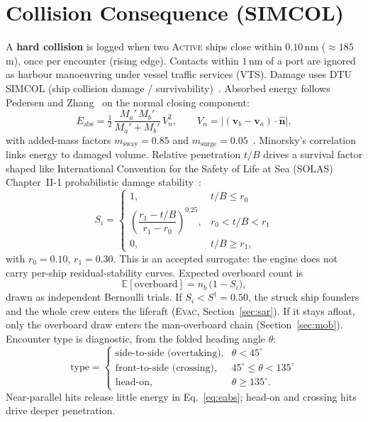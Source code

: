 \documentclass[cameraready]{Interspeech}
\begin{document}
\section{Collision Consequence (SIMCOL)}
\label{sec:consequence}

A \textbf{hard collision} is logged when two \textsc{Active} ships close within $0.10$\,nm (${\approx}185$\,m), once per encounter (rising edge). Contacts within $1$\,nm of a port are ignored as harbour manoeuvring under vessel traffic services (VTS). Damage uses DTU SIMCOL (ship collision damage / survivability)~\cite{lutzen2001}. Absorbed energy follows Pedersen and Zhang~\cite{pedersenzhang1998,lutzen2001} on the normal closing component:
\begin{equation}
  E_{\text{abs}} = \tfrac12\,\frac{M_a'\,M_b'}{M_a' + M_b'}\,V_n^2,
  \qquad
  V_n = \big|(\mathbf{v}_b - \mathbf{v}_a)\cdot\hat{\mathbf{n}}\big|,
  \label{eq:eabs}
\end{equation}
with added-mass factors $m_{\text{sway}} = 0.85$ and $m_{\text{surge}} = 0.05$~\cite{lutzen2001}. Minorsky's correlation~\cite{minorsky1959} links energy to damaged volume. Relative penetration $t/B$ drives a survival factor shaped like International Convention for the Safety of Life at Sea (SOLAS) Chapter~II-1 probabilistic damage stability~\cite{solas2020}:
\begin{equation}
  S_i =
  \begin{cases}
    1, & t/B \le r_0\\[2pt]
    \left(\dfrac{r_1 - t/B}{r_1 - r_0}\right)^{0.25}, & r_0 < t/B < r_1\\[8pt]
    0, & t/B \ge r_1,
  \end{cases}
  \label{eq:sfactor}
\end{equation}
with $r_0 = 0.10$, $r_1 = 0.30$. This is an accepted surrogate: the engine does not carry per-ship residual-stability curves. Expected overboard count is
\begin{equation}
  \mathbb{E}[\text{overboard}] = n_b\,\big(1 - S_i\big),
  \label{eq:overboard}
\end{equation}
drawn as independent Bernoulli trials. If $S_i < S^{\dagger} = 0.50$, the struck ship founders and the whole crew enters the liferaft (\textsc{Evac}, Section~\ref{sec:sar}). If it stays afloat, only the overboard draw enters the man-overboard chain (Section~\ref{sec:mob}). Encounter type is diagnostic, from the folded heading angle $\theta$:
\begin{equation*}
  \text{type} =
  \begin{cases}
    \text{side-to-side (overtaking)}, & \theta < 45^\circ\\
    \text{front-to-side (crossing)},  & 45^\circ \le \theta < 135^\circ\\
    \text{head-on}, & \theta \ge 135^\circ.
  \end{cases}
\end{equation*}
Near-parallel hits release little energy in Eq.~\ref{eq:eabs}; head-on and crossing hits drive deeper penetration.
\end{document}
